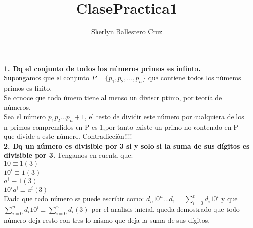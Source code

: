 \documentclass[12pt,a4paper]{article}
\title{ClasePractica1}
\author{Sherlyn Ballestero Cruz }
\begin{document}
\maketitle
\newpage
\textbf{1. Dq el conjunto de todos los n\'umeros primos es infinto.}
\\Supongamos que el conjunto $P=\{p_{1},p_{2},...,p_{n}\}$ que contiene  todos los n\'umeros primos es finito.\\
Se conoce que todo \'umero tiene al menso un divisor ptimo, por teor\'ia de n\'umeros.
\\Sea el n\'umero $p_{1}p_{2}...p_{n}+1$, el resto de dividir este n\'umero por cualquiera de los n primos comprendidos en P es 1,por tanto existe un primo no contenido en P que divide a este n\'umero. Contradicci\'on!!!!
\\\textbf{2. Dq un n\'umero es divisible por 3 si y solo si la suma de sus d\'igitos es divisible por 3.}
 Tengamos en cuenta que:\\
 $10\equiv 1(3)$\\
 $10^{i}\equiv 1(3)$\\
 $a^{i}\equiv 1(3)$\\
 $10^{i}a^{i}\equiv a^{i}(3)$\\
Dado que todo n\'umero se puede escribir como:
$d_{n}10^{n}...d_{1}=\sum_{i=0}^{n}d_{i}10^{i}$ y que
$\sum_{i=0}^{n}d_{i}10^{i} \equiv \sum_{i=0}^{n}d_{i} (3)$
por el analisis inicial, queda demostrado que todo n\'umero deja resto con tres lo mismo que deja la suma de sus d\'igitos.
\end{document}
